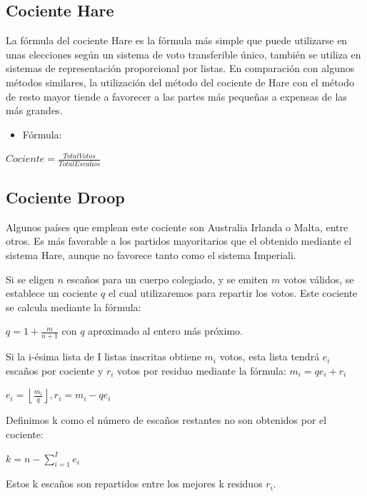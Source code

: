 \documentclass[12pt,a4paper,]{book}
\providecommand{\tightlist}{%
  \setlength{\itemsep}{0pt}\setlength{\parskip}{0pt}}
\numberwithin{dummy}{section}
\theoremstyle{ocrenumbox}
\theoremstyle{blacknumex}
\theoremstyle{blacknumbox}
\theoremstyle{ocrenum}
\theoremstyle{ocrenum}
\begin{document}
\hypertarget{cociente-hare}{%
\subsection{Cociente Hare}\label{cociente-hare}}

La fórmula del cociente Hare es la fórmula más simple que puede
utilizarse en unas elecciones según un sistema de voto transferible
único, también se utiliza en sistemas de representación proporcional por
listas. En comparación con algunos métodos similares, la utilización del
método del cociente de Hare con el método de resto mayor tiende a
favorecer a las partes más pequeñas a expensas de las más grandes.

\begin{itemize}
\tightlist
\item
  Fórmula:
\end{itemize}

\(Cociente = \frac{Total Votos}{Total Escaños}\)

\hypertarget{cociente-droop}{%
\subsection{Cociente Droop}\label{cociente-droop}}

Algunos países que emplean este cociente son Australia Irlanda o Malta,
entre otros. Es más favorable a los partidos mayoritarios que el
obtenido mediante el sistema Hare, aunque no favorece tanto como el
sistema Imperiali.

Si se eligen \({n}\) escaños para un cuerpo colegiado, y se emiten
\({m}\) votos válidos, se establece un cociente \({q}\) el cual
utilizaremos para repartir los votos. Este cociente se calcula mediante
la fórmula:

\({q=1+{\frac {m}{n+1}}}\) con \(q\) aproximado al entero más próximo.

Si la i-ésima lista de I listas inscritas obtiene \({m_{i}}\) votos,
esta lista tendrá \({e_{i}}\) escaños por cociente y \({r_{i}}\) votos
por residuo mediante la fórmula: \({m_{i}=qe_{i}+r_{i}}\)

\({e_{i}=\left\lfloor {\frac {m_{i}}{q}}\right\rfloor ,r_{i}=m_{i}-qe_{i}}\)

Definimos k como el número de escaños restantes no son obtenidos por el
cociente:

\({k=n-\sum _{i=1}^{I}e_{i}}\)

Estos k escaños son repartidos entre los mejores k residuos \({r_{i}}\).
\end{document}

